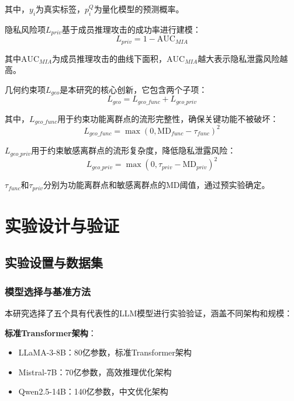 其中，$y_i$为真实标签，$p_i^Q$为量化模型的预测概率。

隐私风险项$L_{priv}$基于成员推理攻击的成功率进行建模：
\begin{equation}
L_{priv} = 1 - \text{AUC}_{MIA}
\end{equation}

其中$\text{AUC}_{MIA}$为成员推理攻击的曲线下面积，$\text{AUC}_{MIA}$越大表示隐私泄露风险越高。

几何约束项$L_{geo}$是本研究的核心创新，它包含两个子项：
\begin{equation}
L_{geo} = L_{geo\_func} + L_{geo\_priv}
\end{equation}

其中，$L_{geo\_func}$用于约束功能离群点的流形完整性，确保关键功能不被破坏：
\begin{equation}
L_{geo\_func} = \max(0, \text{MD}_{func} - \tau_{func})^2
\end{equation}

$L_{geo\_priv}$用于约束敏感离群点的流形复杂度，降低隐私泄露风险：
\begin{equation}
L_{geo\_priv} = \max(0, \tau_{priv} - \text{MD}_{priv})^2
\end{equation}

$\tau_{func}$和$\tau_{priv}$分别为功能离群点和敏感离群点的MD阈值，通过预实验确定。

\section{实验设计与验证}

\subsection{实验设置与数据集}

\subsubsection{模型选择与基准方法}

本研究选择了五个具有代表性的LLM模型进行实验验证，涵盖不同架构和规模：

\textbf{标准Transformer架构}：
\begin{itemize}
\item LLaMA-3-8B：80亿参数，标准Transformer架构
\item Mistral-7B：70亿参数，高效推理优化架构
\item Qwen2.5-14B：140亿参数，中文优化架构
\end{itemize}

